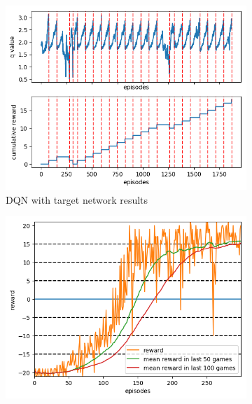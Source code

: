 \documentclass[10pt]{article}
\begin{document}
\begin{figure}
\begin{subfigure}{0.49\textwidth}
\begin{minipage}{\linewidth}
			\includegraphics[width=\linewidth]{DDQN_game.png}
		\end{minipage}\vfill
		\caption{DQN with target network results}
	\end{subfigure}
		\begin{subfigure}{0.49\textwidth}
			\centering
			\begin{minipage}{\linewidth}
				\includegraphics[width=\linewidth]{duel_DDQN_reward.png}
			\end{minipage}\vfill
			\begin{minipage}{\linewidth}

\end{minipage}
\end{subfigure}
\end{figure}
\end{document}
